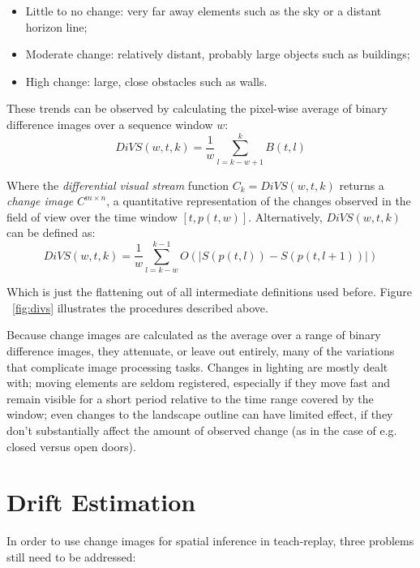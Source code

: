 \documentclass[twocolumn, 9pt,fleqn]{jsproceedings}
\begin{document}
\begin{itemize}
\item Little to no change: very far away elements such as the sky or a distant horizon line;
\item Moderate change: relatively distant, probably large objects such as buildings;
\item High change: large, close obstacles such as walls.
\end{itemize}

These trends can be observed by calculating the pixel-wise average of binary difference images over a sequence window $w$:
\begin{equation}
DiVS(w, t, k) = \frac{1}{w} \sum_{l=k-w+1}^{k}{B(t, l)}
\end{equation}

Where the \textit{differential visual stream} function $C_k = DiVS(w, t, k)$ returns a  \textit{change image} $C^{m \times n}$, a quantitative representation of the changes observed in the field of view over the time window $[t, p(t, w)]$. Alternatively, $DiVS(w, t, k)$ can be defined as:
\begin{equation}
DiVS(w, t, k) = \frac{1}{w} \sum_{l=k-w}^{k-1}{O(|S(p(t, l)) - S(p(t, l+1))|)}
\end{equation}

Which is just the flattening out of all intermediate definitions used before. Figure ~\ref{fig:divs} illustrates the procedures described above.

Because change images are calculated as the average over a range of binary difference images, they attenuate, or leave out entirely, many of the variations that complicate image processing tasks. Changes in lighting are mostly dealt with; moving elements are seldom registered, especially if they move fast and remain visible for a short period relative to the time range covered by the window; even changes to the landscape outline can have limited effect, if they don't substantially affect the amount of observed change (as in the case of e.g. closed versus open doors).

\section{Drift Estimation}

In order to use change images for spatial inference in teach-replay, three problems still need to be addressed:
\end{document}
